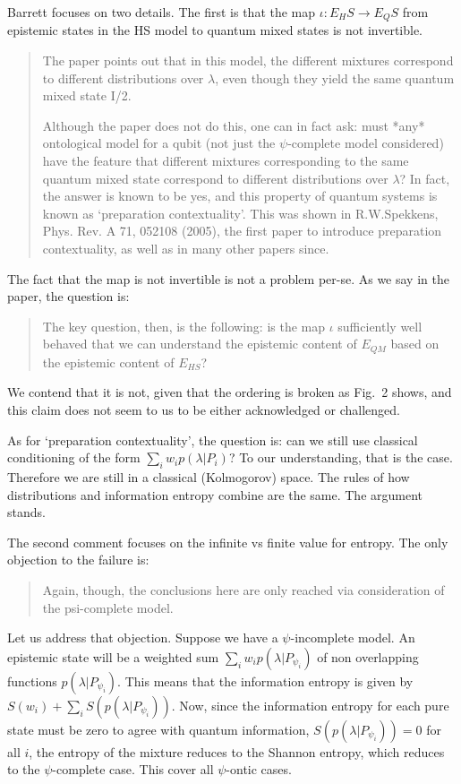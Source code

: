 \documentclass[11pt]{article}
\begin{document}
	Barrett focuses on two details. The first is that the map $\iota : E_HS \to E_QS$ from epistemic states in the HS model to quantum mixed states is not invertible. 
	\begin{quote}
The paper points out that in this model, the different mixtures
correspond to different distributions over $\lambda$, even though they yield the
same quantum mixed state I/2.

Although the paper does not do this, one can in fact ask: must *any* ontological
model for a qubit (not just the $\psi$-complete model considered) have the feature
that different mixtures corresponding to the same quantum mixed state correspond
to different distributions over $\lambda$? In fact, the answer is known to be yes,
and this property of quantum systems is known as `preparation contextuality’.
This was shown in R.W.Spekkens, Phys. Rev. A 71, 052108 (2005), the first paper
to introduce preparation contextuality, as well as in many other papers since.
	\end{quote}

	The fact that the map is not invertible is not a problem per-se. As we say in the paper, the question is:
	\begin{quote}
The key question, then, is the following: is the
map $\iota$ sufficiently well behaved that we can understand
the epistemic content of $E_{QM}$ based on the epistemic
content of $E_{HS}$?
	\end{quote}
We contend that it is not, given that the ordering is broken as Fig.~2 shows, and this claim does not seem to us to be either acknowledged or challenged.

As for `preparation contextuality', the question is: can we still use classical conditioning of the form $\sum_i  w_i p(\lambda| P_i)$? To our understanding, that is the case. Therefore we are still in a classical (Kolmogorov) space. The rules of how distributions and information entropy combine are the same. The argument stands.

The second comment focuses on the infinite vs finite value for entropy. The only objection to the failure is:
\begin{quote}
Again, though, the conclusions here are only reached via consideration of the psi-complete model.
\end{quote}
Let us address that objection. Suppose we have a $\psi$-incomplete model. An epistemic state will be a weighted sum $\sum_i  w_i p(\lambda| P_{\psi_i})$ of non overlapping functions $p(\lambda| P_{\psi_i})$. This means that the information entropy is given by $S(w_i) + \sum_i S(p(\lambda| P_{\psi_i}))$. Now, since the information entropy for each pure state must be zero to agree with quantum information, $S(p(\lambda| P_{\psi_i}))=0$ for all $i$, the entropy of the mixture reduces to the Shannon entropy, which reduces to the $\psi$-complete case. This cover all $\psi$-ontic cases.
\end{document}
